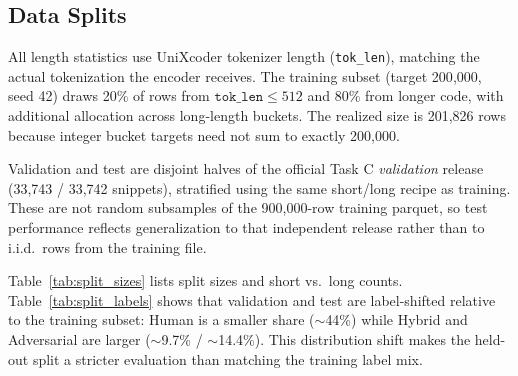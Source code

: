 \documentclass[conference]{IEEEtran}
\begin{document}
\begin{table}[htbp]
  \centering
  \caption{Label distribution: full training file vs.\ stratified subset used for model training (same taxonomy).}
  \label{tab:train_dist}
\end{table}

\subsection{Data Splits}

All length statistics use UniXcoder tokenizer length (\texttt{tok\_len}), matching the actual tokenization the encoder receives. The training subset (target 200{,}000, seed 42) draws 20\% of rows from $\texttt{tok\_len} \leq 512$ and 80\% from longer code, with additional allocation across long-length buckets. The realized size is 201{,}826 rows because integer bucket targets need not sum to exactly 200{,}000.

Validation and test are disjoint halves of the official Task C \emph{validation} release (33{,}743 / 33{,}742 snippets), stratified using the same short/long recipe as training. These are not random subsamples of the 900{,}000-row training parquet, so test performance reflects generalization to that independent release rather than to i.i.d.\ rows from the training file.

Table~\ref{tab:split_sizes} lists split sizes and short vs.\ long counts. Table~\ref{tab:split_labels} shows that validation and test are label-shifted relative to the training subset: Human is a smaller share ($\sim$44\%) while Hybrid and Adversarial are larger ($\sim$9.7\% / $\sim$14.4\%). This distribution shift makes the held-out split a stricter evaluation than matching the training label mix.
\end{document}
